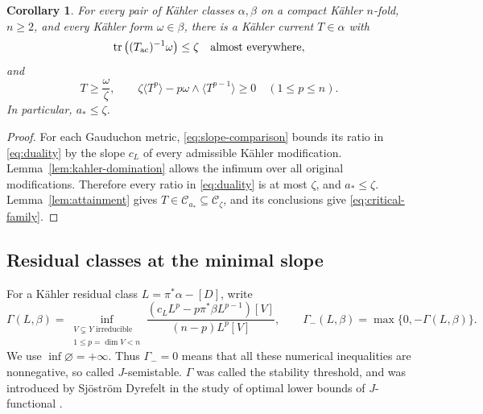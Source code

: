 \documentclass[reqno]{amsart}
\numberwithin{equation}{section}
\newtheorem{corollary}[theorem]{Corollary}
\theoremstyle{definition}
\DeclareMathOperator{\tr}{tr}
\begin{document}
\begin{corollary}\label{cor:critical-family}
For every pair of K\"ahler classes $\alpha,\beta$ on a compact K\"ahler $n$-fold, $n\geq2$, and every K\"ahler form $\omega\in\beta$, there is a K\"ahler current $T\in\alpha$ with
\[
\tr\big((T_{\rm ac})^{-1}\omega\big)\leq\zeta
\quad\text{almost everywhere},
\]
and
\begin{equation}\label{eq:critical-family}
T\geq\frac{\omega}{\zeta},\qquad
\zeta\langle T^p\rangle-p\omega\wedge\langle T^{p-1}\rangle\geq0
\quad(1\leq p\leq n).
\end{equation}
In particular, $a_*\le\zeta$.
\end{corollary}
\begin{proof}

For each Gauduchon metric, \eqref{eq:slope-comparison} bounds its ratio in \eqref{eq:duality} by the slope $c_L$ of every admissible K\"ahler modification. Lemma~\ref{lem:kahler-domination} allows the infimum over all original modifications. Therefore every ratio in \eqref{eq:duality} is at most $\zeta$, and $a_*\leq\zeta$. Lemma~\ref{lem:attainment} gives $T\in\mathcal C_{a_*}\subseteq\mathcal C_\zeta$, and its conclusions give \eqref{eq:critical-family}.
\end{proof}

\subsection{Residual classes at the minimal slope}

For a K\"ahler residual class $L=\pi^*\alpha-[D]$, write
\begin{equation}\label{eq:residual-threshold}
 \Gamma(L,\beta)=\inf_{\substack{V\subsetneq Y\text{ irreducible}\\1\le p=\dim V<n}}
 \frac{(c_LL^p-p\pi^*\beta L^{p-1})[V]}{(n-p)L^p[V]},
 \qquad \Gamma_-(L,\beta)=\max\{0,-\Gamma(L,\beta)\}.
\end{equation}
We use $\inf\varnothing=+\infty$. Thus $\Gamma_-=0$ means that all these numerical inequalities are nonnegative, so called $J$-semistable. $\Gamma$ was called the stability threshold, and was introduced by Sjöström Dyrefelt in the study of optimal lower bounds of $J$-functional \cite{SD20}. 
\end{document}
